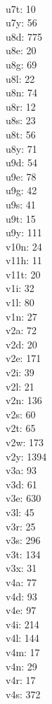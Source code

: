 \begin{multicols}{8}
  \\u7t: 10
  \\u7y: 56
  \\u8d: 775
  \\u8e: 20
  \\u8g: 69
  \\u8l: 22
  \\u8n: 74
  \\u8r: 12
  \\u8s: 23
  \\u8t: 56
  \\u8y: 71
  \\u9d: 54
  \\u9e: 78
  \\u9g: 42
  \\u9s: 41
  \\u9t: 15
  \\u9y: 111
  \\v10n: 24
  \\v11h: 11
  \\v11t: 20
  \\v1i: 32
  \\v1l: 80
  \\v1n: 27
  \\v2a: 72
  \\v2d: 20
  \\v2e: 171
  \\v2i: 39
  \\v2l: 21
  \\v2n: 136
  \\v2s: 60
  \\v2t: 65
  \\v2w: 173
  \\v2y: 1394
  \\v3a: 93
  \\v3d: 61
  \\v3e: 630
  \\v3l: 45
  \\v3r: 25
  \\v3s: 296
  \\v3t: 134
  \\v3x: 31
  \\v4a: 77
  \\v4d: 93
  \\v4e: 97
  \\v4i: 214
  \\v4l: 144
  \\v4m: 17
  \\v4n: 29
  \\v4r: 17
  \\v4s: 372

\end{multicols}
